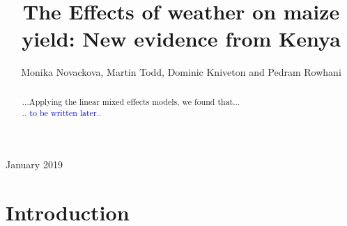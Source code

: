 \documentclass[12pt]{iopart}
\begin{document}
\submitto{\ERL}

\title{The Effects of weather on maize yield: New evidence from Kenya}

\author{Monika Novackova, Martin Todd, Dominic Kniveton and Pedram Rowhani}

\address{Department of Geography, University of Sussex, Falmer, UK}
\vspace{10pt}
\begin{indented}
\item[]January 2019
\end{indented}

\doublespacing
\begin{abstract}
...Applying the linear mixed effects models, we found that...\\
\textcolor{blue}{.. to be written later..}
\end{abstract}

%
%
%
% 
%
\maketitle
\section{Introduction}\label{Introduction}
\end{document}
